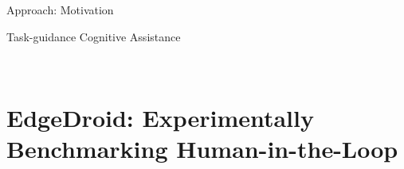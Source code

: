 \documentclass[aspectratio=1610]{beamer}
\begin{document}

\begin{frame}{Approach: Motivation}
    \begin{center}
        \vspace{.1\textheight}%
    \end{center}
\end{frame}

\begin{frame}{Task-guidance Cognitive Assistance}
    \begin{center}
        \footnotesize%
        \\
    \end{center}
\end{frame}

\section{EdgeDroid: Experimentally Benchmarking Human-in-the-Loop}
\end{document}
